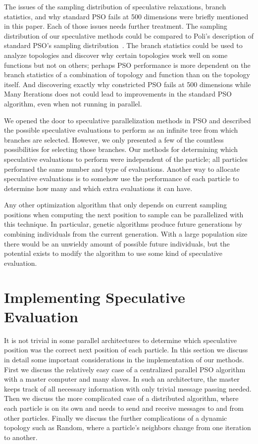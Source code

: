 \documentclass[smallcondensed]{svjour3}
\begin{document}
The issues of the sampling distribution of speculative relaxations, branch
statistics, and why standard PSO fails at 500 dimensions were briefly mentioned
in this paper.  Each of those issues needs further treatment.  The sampling
distribution of our speculative methods could be compared to Poli's description
of standard PSO's sampling
distribution~\citep{poli-2008-sampling-distribution-of-pso}.  The branch
statistics could be used to analyze topologies and discover why certain
topologies work well on some functions but not on others; perhaps PSO
performance is more dependent on the branch statistics of a combination of
topology and function than on the topology itself.  And discovering exactly why
constricted PSO fails at 500 dimensions while Many Iterations does not could
lead to improvements in the standard PSO algorithm, even when not running in
parallel.

We opened the door to speculative parallelization methods in PSO and described
the possible speculative evaluations to perform as an infinite tree from which
branches are selected.  However, we only presented a few of the countless
possibilities for selecting those branches.  Our methods for determining which
speculative evaluations to perform were independent of the particle; all
particles performed the same number and type of evaluations.  Another way to
allocate speculative evaluations is to somehow use the performance of each
particle to determine how many and which extra evaluations it can have.

Any other optimization algorithm that only depends on current sampling
positions when computing the next position to sample can be parallelized with
this technique.  In particular, genetic algorithms produce future generations
by combining individuals from the current generation.  With a large population
size there would be an unwieldy amount of possible future individuals, but the
potential exists to modify the algorithm to use some kind of speculative
evaluation.

\appendix

\section{Implementing Speculative Evaluation}
\label{sec:implementation}

It is not trivial in some parallel architectures to determine which speculative
position was the correct next position of each particle.  In this section we
discuss in detail some important considerations in the implementation of our
methods.  First we discuss the relatively easy case of a centralized parallel
PSO algorithm with a master computer and many slaves.  In such an architecture,
the master keeps track of all necessary information with only trivial message
passing needed.  Then we discuss the more complicated case of a distributed
algorithm, where each particle is on its own and needs to send and receive
messages to and from other particles.  Finally we discuss the further
complications of a dynamic topology such as Random, where a particle's
neighbors change from one iteration to another.
\end{document}
